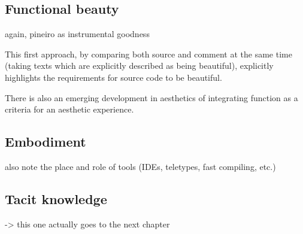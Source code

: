 \subsection{Functional beauty}

again, pineiro as instrumental goodness

This first approach, by comparing both source and comment at the same time (taking texts which are explicitly described as being beautiful), explicitly highlights the requirements for source code to be beautiful.

There is also an emerging development in aesthetics of integrating function as a criteria for an aesthetic experience.

\subsection{Embodiment}

also note the place and role of tools (IDEs, teletypes, fast compiling, etc.)

\subsection{Tacit knowledge}

-> this one actually goes to the next chapter

